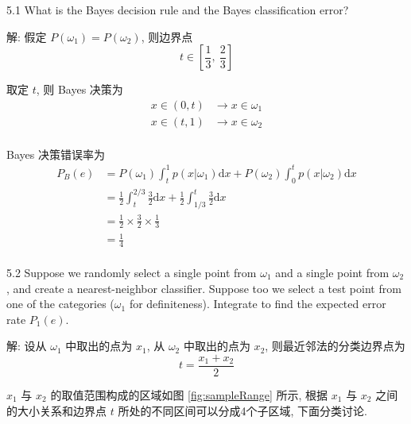 \documentclass[openany]{ctexbook}
\theoremstyle{kaiti}
\theoremstyle{normal}
\begin{document}
5.1  What is the Bayes decision rule and the Bayes classification error?

解: 假定 $P(\omega_1)=P(\omega_2)$, 则边界点
\begin{equation}
  t\in\left[\frac{1}{3},~\frac{2}{3}\right]
\end{equation}

取定 $t$, 则 Bayes 决策为
\begin{equation}
  \begin{aligned}
    x\in(0,t)&\to x\in\omega_1\\
    x\in(t,1)&\to x\in\omega_2\\
  \end{aligned}
\end{equation}

Bayes 决策错误率为
\begin{equation}
  \begin{aligned}
    P_B(e)
    &=P(\omega_1)\int_{t}^1p(x|\omega_1)\mathrm{d}x+P(\omega_2)\int_{0}^tp(x|\omega_2)\mathrm{d}x\\
    &=\frac{1}{2}\int_{t}^{2/3}\frac{3}{2}\mathrm{d}x+\frac{1}{2}\int_{1/3}^{t}\frac{3}{2}\mathrm{d}x\\
    &=\frac{1}{2}\times\frac{3}{2}\times\frac{1}{3}\\
    &=\frac{1}{4}\\
  \end{aligned}
\end{equation}

5.2 Suppose we randomly select a single point from $\omega_{1}$ and a single point from $\omega_{2}$, and create a nearest-neighbor classifier. Suppose too we select a test point from one of the categories ($\omega_{1}$ for definiteness). Integrate to find the expected error rate $P_{1}(e)$.

解: 设从 $\omega_1$ 中取出的点为 $x_1$, 从 $\omega_2$ 中取出的点为 $x_2$, 则最近邻法的分类边界点为
\begin{equation}
  t=\frac{x_1+x_2}{2}
\end{equation}

$x_1$ 与 $x_2$ 的取值范围构成的区域如图 \ref{fig:sampleRange} 所示, 根据 $x_1$ 与 $x_2$ 之间的大小关系和边界点 $t$ 所处的不同区间可以分成4个子区域, 下面分类讨论.
\end{document}
